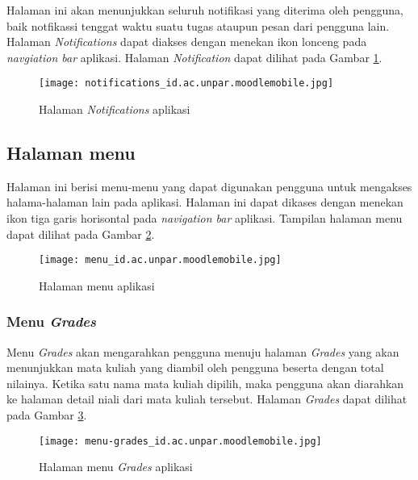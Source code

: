 Halaman ini akan menunjukkan seluruh notifikasi yang diterima oleh pengguna, baik notfikassi tenggat waktu suatu tugas ataupun pesan dari pengguna lain. Halaman \textit{Notifications} dapat diakses dengan menekan ikon lonceng pada \textit{navgiation bar} aplikasi. Halaman \textit{Notification} dapat dilihat pada Gambar \ref{app:notifications}.


\begin{figure}[H] 
	\centering  
	\texttt{[image: notifications\_id.ac.unpar.moodlemobile.jpg]}  
	\caption[Halaman \textit{Notifications} aplikasi] {Halaman \textit{Notifications} aplikasi} 
	\label{app:notifications} 
\end{figure}  

\subsection{Halaman menu}

Halaman ini berisi menu-menu yang dapat digunakan pengguna untuk mengakses halama-halaman lain pada aplikasi. Halaman ini dapat dikases dengan menekan ikon tiga garis horisontal pada \textit{navigation bar} aplikasi. Tampilan halaman menu dapat dilihat pada Gambar \ref{app:menu}.

\begin{figure}[H] 
	\centering  
	\texttt{[image: menu\_id.ac.unpar.moodlemobile.jpg]}  
	\caption[Halaman menu aplikasi] {Halaman menu aplikasi} 
	\label{app:menu} 
\end{figure}  

\subsubsection{Menu \textit{Grades}}

Menu \textit{Grades} akan mengarahkan pengguna menuju halaman \textit{Grades} yang akan menunjukkan mata kuliah yang diambil oleh pengguna beserta dengan total nilainya. Ketika satu nama mata kuliah dipilih, maka pengguna akan diarahkan ke halaman detail niali dari mata kuliah tersebut. Halaman \textit{Grades} dapat dilihat pada Gambar \ref{app:menu:grades}.

\begin{figure}[H] 
	\centering  
	\texttt{[image: menu-grades\_id.ac.unpar.moodlemobile.jpg]}  
	\caption[Halaman menu \textit{Grades} aplikasi] {Halaman menu \textit{Grades} aplikasi} 
	\label{app:menu:grades} 
\end{figure}  

